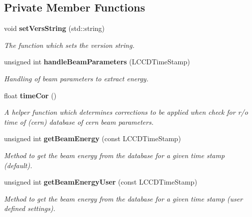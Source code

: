 \subsection*{Private Member Functions}
\begin{DoxyCompactItemize}
\item 
void {\bf setVersString} (std::string)\label{classmarlin_1_1RunInfoProcessor_ac7333b2dd94c0dfaf019efda7d51783c}

\begin{DoxyCompactList}\small\item\em The function which sets the version string. \item\end{DoxyCompactList}\item 
unsigned int {\bf handleBeamParameters} (LCCDTimeStamp)
\begin{DoxyCompactList}\small\item\em Handling of beam parameters to extract energy. \item\end{DoxyCompactList}\item 
float {\bf timeCor} ()
\begin{DoxyCompactList}\small\item\em A helper function which determines corrections to be applied when check for r/o time of (cern) database of cern beam parameters. \item\end{DoxyCompactList}\item 
unsigned int {\bf getBeamEnergy} (const LCCDTimeStamp)\label{classmarlin_1_1RunInfoProcessor_af25973c2f75e0cc7d1a2e963ae6f1ae0}

\begin{DoxyCompactList}\small\item\em Method to get the beam energy from the database for a given time stamp (default). \item\end{DoxyCompactList}\item 
unsigned int {\bf getBeamEnergyUser} (const LCCDTimeStamp)\label{classmarlin_1_1RunInfoProcessor_a2a9f3d4420e6d5413b52aa4a9f909ab2}

\begin{DoxyCompactList}\small\item\em Method to get the beam energy from the database for a given time stamp (user defined settings). \item\end{DoxyCompactList}\end{DoxyCompactItemize}
